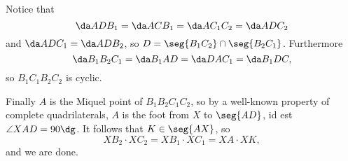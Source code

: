 Notice that \[\da ADB_1=\da ACB_1=\da AC_1C_2=\da ADC_2\]
and $\da ADC_1=\da ADB_2$, so $D=\seg{B_1C_2}\cap\seg{B_2C_1}$. Furthermore \[\da B_1B_2C_1=\da B_1AD=\da DAC_1=\da B_1DC,\]
so $B_1C_1B_2C_2$ is cyclic.

Finally $A$ is the Miquel point of $B_1B_2C_1C_2$, so by a well-known property of complete quadrilaterals, $A$ is the foot from $X$ to $\seg{AD}$, id est $\angle XAD=90\dg$. It follows that $K\in\seg{AX}$, so \[XB_2\cdot XC_2=XB_1\cdot XC_1=XA\cdot XK,\]
and we are done.
